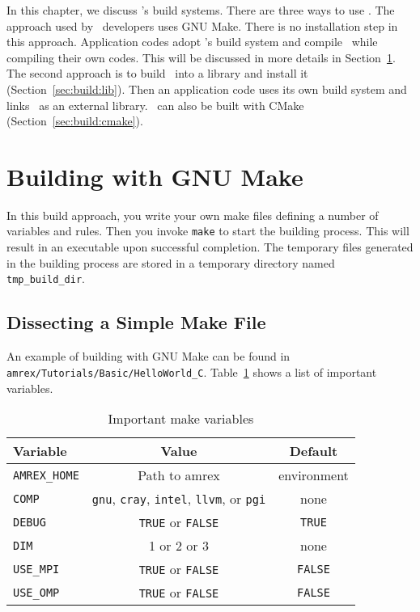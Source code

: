 
In this chapter, we discuss \amrex's build systems.  There are three
ways to use \amrex.  The approach used by \amrex\ developers uses GNU
Make.  There is no installation step in this approach.  Application
codes adopt \amrex's build system and compile \amrex\ while compiling
their own codes.  This will be discussed in more details in
Section~\ref{sec:build:make}.  The second approach is to build \amrex\
into a library and install it (Section~\ref{sec:build:lib}).  Then an
application code uses its own build system and links \amrex\ as an
external library.  \amrex\ can also be built with CMake
(Section~\ref{sec:build:cmake}).

\section{Building with GNU Make}
\label{sec:build:make}

In this build approach, you write your own make files defining a
number of variables and rules.  Then you invoke {\tt make} to start
the building process.  This will result in an executable upon
successful completion.  The temporary files generated in the building
process are stored in a temporary directory named {\tt
  tmp\_build\_dir}.

\subsection{Dissecting a Simple Make File}

An example of building with GNU Make can be found in {\tt
  amrex/Tutorials/Basic/HelloWorld\_C}.  Table~\ref{tab:makevarimp}
shows a list of important variables.
\begin{table}[t]
  \centering
  \begin{tabular}{lcc}
    Variable & Value & Default \\
    \hline
    {\tt AMREX\_HOME} & Path to amrex & environment \\
    {\tt COMP} & {\tt gnu}, {\tt cray}, {\tt intel}, {\tt llvm}, or {\tt pgi} & none \\
    {\tt DEBUG} & {\tt TRUE} or {\tt FALSE} & {\tt TRUE} \\
    {\tt DIM} & 1 or 2 or 3 & none \\
    {\tt USE\_MPI} & {\tt TRUE} or {\tt FALSE} & {\tt FALSE} \\
    {\tt USE\_OMP} & {\tt TRUE} or {\tt FALSE} & {\tt FALSE} \\
    \hline
  \end{tabular}
  \caption{\label{tab:makevarimp} Important make variables}
\end{table}

